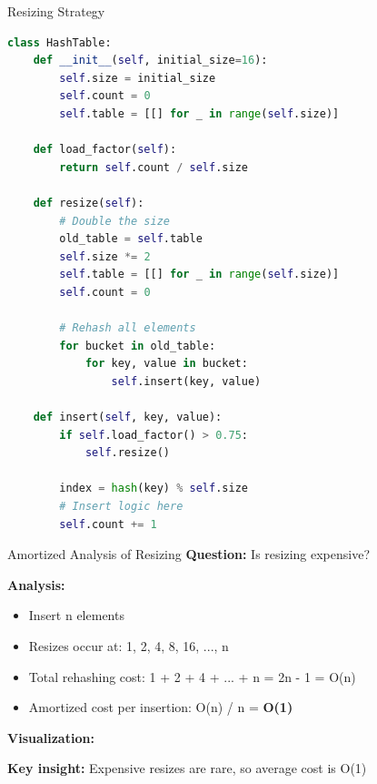 \documentclass[aspectratio=169]{beamer}
\begin{document}
\begin{frame}[fragile]{Resizing Strategy}
  \begin{lstlisting}[language=Python, basicstyle=\ttfamily\footnotesize]
class HashTable:
    def __init__(self, initial_size=16):
        self.size = initial_size
        self.count = 0
        self.table = [[] for _ in range(self.size)]

    def load_factor(self):
        return self.count / self.size

    def resize(self):
        # Double the size
        old_table = self.table
        self.size *= 2
        self.table = [[] for _ in range(self.size)]
        self.count = 0

        # Rehash all elements
        for bucket in old_table:
            for key, value in bucket:
                self.insert(key, value)

    def insert(self, key, value):
        if self.load_factor() > 0.75:
            self.resize()

        index = hash(key) % self.size
        # Insert logic here
        self.count += 1
  \end{lstlisting}
\end{frame}

\begin{frame}{Amortized Analysis of Resizing}
  \textbf{Question:} Is resizing expensive?

  \vspace{0.3cm}
  \textbf{Analysis:}
  \begin{itemize}
    \item Insert n elements
    \item Resizes occur at: 1, 2, 4, 8, 16, ..., n
    \item Total rehashing cost: 1 + 2 + 4 + ... + n = 2n - 1 = O(n)
    \item Amortized cost per insertion: O(n) / n = \textbf{O(1)}
  \end{itemize}

  \vspace{0.3cm}
  \textbf{Visualization:}
  \begin{center}
  \end{center}

  \vspace{0.3cm}
  \textbf{Key insight:} Expensive resizes are rare, so average cost is O(1)
\end{frame}
\end{document}
